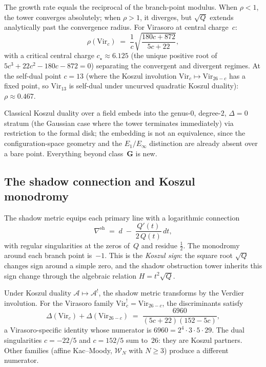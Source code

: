 \documentclass[11pt,reqno]{amsart}
\theoremstyle{definition}
\theoremstyle{remark}
\newcommand{\cA}{\mathcal{A}}
\newcommand{\Vir}{\mathrm{Vir}}
\newcommand{\cW}{\mathcal{W}}
\numberwithin{equation}{section}
\begin{document}
The growth rate equals the reciprocal of the branch-point modulus.
When $\rho < 1$, the tower converges absolutely; when $\rho > 1$,
it diverges, but $\sqrt{Q}$ extends analytically past the
convergence radius. For Virasoro at central charge~$c$:
\begin{equation}\label{eq:intro-virasoro-rho}
 \rho(\Vir_c)
 \;=\;
 \frac{1}{c}\sqrt{\frac{180c + 872}{5c + 22}},
\end{equation}
with a critical central charge $c_\star \approx 6.125$ (the
unique positive root of $5c^3 + 22c^2 - 180c - 872 = 0$)
separating the convergent and divergent regimes. At the
self-dual point $c = 13$ (where the Koszul involution
$\Vir_c \mapsto \Vir_{26-c}$ has a fixed point, so $\Vir_{13}$
is self-dual under uncurved quadratic Koszul duality):
$\rho \approx 0.467$.

Classical Koszul duality over a field embeds into the genus-$0$,
degree-$2$, $\Delta = 0$ stratum (the Gaussian case where the tower
terminates immediately) via restriction to the formal disk;
the embedding is not an equivalence, since the configuration-space
geometry and the $E_1/E_\infty$ distinction are already absent
over a bare point. Everything beyond class~$\mathbf{G}$ is new.

\subsection{The shadow connection and Koszul monodromy}

The shadow metric equips each primary line with a logarithmic connection
\begin{equation}\label{eq:intro-connection}
 \nabla^{\mathrm{sh}}
 \;=\;
 d \;-\; \frac{Q'(t)}{2\,Q(t)}\,dt,
\end{equation}
with regular singularities at the zeros of~$Q$ and residue
$\frac{1}{2}$. The monodromy around each branch point is~$-1$.
This is the \emph{Koszul sign}: the square root $\sqrt{Q}$
changes sign around a simple zero, and the shadow obstruction tower inherits
this sign change through the algebraic relation
$H = t^2\sqrt{Q}$.

Under Koszul duality $\cA \mapsto \cA^!$, the shadow metric
transforms by the Verdier involution. For the Virasoro family
$\Vir_c^! = \Vir_{26-c}$, the discriminants satisfy
\begin{equation}\label{eq:intro-disc-complementarity}
 \Delta(\Vir_c) + \Delta(\Vir_{26-c})
 \;=\;
 \frac{6960}{(5c + 22)(152 - 5c)},
\end{equation}
a Virasoro-specific identity whose numerator is
$6960 = 2^4 \cdot 3 \cdot 5 \cdot 29$.
The dual singularities $c = -22/5$ and $c = 152/5$
sum to~$26$: they are Koszul partners. Other families
(affine Kac--Moody, $\cW_N$ with $N \ge 3$) produce a
different numerator.
\end{document}
